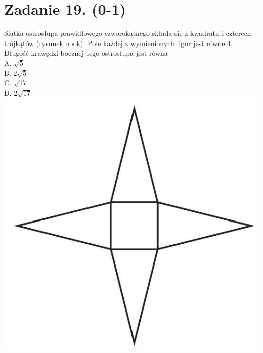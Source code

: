 \documentclass[10pt]{article}
\begin{document}
\section*{Zadanie 19. (0-1)}
Siatka ostrosłupa prawidłowego czworokątnego składa się z kwadratu i czterech trójkątów (rysunek obok). Pole każdej z wymienionych figur jest równe 4. Długość krawędzi bocznej tego ostrosłupa jest równa\\
A. \(\sqrt{5}\)\\
B. \(2 \sqrt{5}\)\\
C. \(\sqrt{17}\)\\
D. \(2 \sqrt{17}\)\\
\includegraphics[max width=\textwidth, center]{2024_11_21_dd21f7544b65bcf1b3c7g-08(1)}
\end{document}
